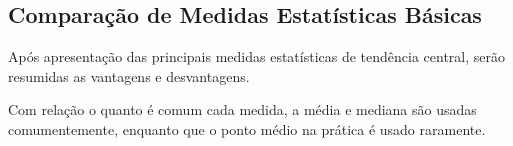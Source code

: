 




\newpage
\subsection{Comparação de Medidas Estatísticas Básicas}

\inic Após apresentação das principais medidas estatísticas de tendência central, serão resumidas as vantagens e desvantagens.\vskip0.3cm

\inic Com relação o quanto é comum cada medida, a média e mediana são usadas comumentemente, enquanto que o ponto médio na prática é usado raramente.\vskip0.3cm


